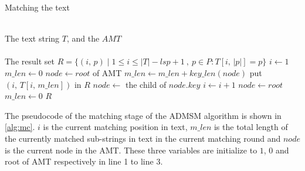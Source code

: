 \documentclass[legalpaper]{article}
\begin{document}



\begin{algorithm}
  \caption{Matching the text}
  \label{alg:mc}
  \begin{algorithmic}[1]
    \REQUIRE ~~\\
    The text string $T$, and the $AMT$ \\
    \ENSURE ~~\\
    The result set $R = \{(i,\,p) \mid 1 \le i \le |T|-lsp+1\ ,\ p \in P :
    T[i,\,|p|] = p \}$
    \STATE $i \leftarrow 1$
    \STATE $m\_len \leftarrow 0$
    \STATE $node \leftarrow root$ of AMT
    \STATE
    \STATE $m\_len \leftarrow m\_len + key\_len(node)$
    \STATE put $(i,\,T[i,\,m\_len])$ in $R$
    \ENDIF
    \STATE $node \leftarrow$ the child of $node.key$
    \ENDWHILE
    \STATE $i \leftarrow i+1$
    \STATE $node \leftarrow root$
    \STATE $m\_len \leftarrow 0$
    \ENDWHILE
    \STATE
    \RETURN $R$
  \end{algorithmic}
\end{algorithm}

The pseudocode of the matching stage of the \textsf{ADMSM} algorithm
is shown in \ref{alg:mc}. $i$ is the current matching position in
text, $m\_len$ is the total length of the currently matched
sub-strings in text in the current matching round and $node$ is the
current node in the \textsf{AMT}. These three variables are initialize
to $1$, $0$ and root of \textsf{AMT} respectively in line 1 to line 3.
\end{document}
